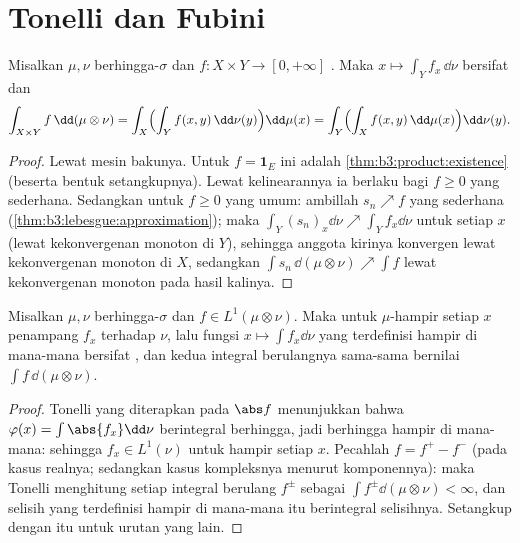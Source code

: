 \section{Tonelli dan Fubini}

\begin{theorem}[Tonelli]\label{thm:b3:product:tonelli}
Misalkan $\mu, \nu$ berhingga-$\sigma$ dan $f \colon X\times Y \to [0,
+\infty]$ . Maka $x \mapsto \int_Y f_x\,\dd\nu$ bersifat
 dan
\[
\int_{X\times Y}f\,\dd(\mu\otimes\nu)
= \int_X\Bigl(\int_Y f(x,y)\,\dd\nu(y)\Bigr)\dd\mu(x)
= \int_Y\Bigl(\int_X f(x,y)\,\dd\mu(x)\Bigr)\dd\nu(y).
\]
\end{theorem}

\begin{proof}
Lewat mesin bakunya. Untuk $f = \mathbf 1_E$ ini adalah
\cref{thm:b3:product:existence} (beserta bentuk setangkupnya). Lewat
kelinearannya ia berlaku bagi $f \geq 0$ yang sederhana. Sedangkan untuk $f \geq
0$ yang umum: ambillah $s_n \nearrow f$ yang sederhana
(\cref{thm:b3:lebesgue:approximation}); maka $\int_Y(s_n)_x
\dd\nu \nearrow \int_Y f_x\dd\nu$ untuk setiap $x$ (lewat kekonvergenan monoton di $Y$),
sehingga anggota kirinya konvergen lewat kekonvergenan monoton di $X$, sedangkan
$\int s_n\,\dd(\mu\otimes\nu) \nearrow \int f$ lewat kekonvergenan monoton pada
hasil kalinya.
\end{proof}

\begin{theorem}[Fubini]\label{thm:b3:product:fubini}
Misalkan $\mu, \nu$ berhingga-$\sigma$ dan $f \in L^1(\mu\otimes\nu)$. Maka
untuk $\mu$-hampir setiap $x$ penampang $f_x$  terhadap $\nu$, lalu
fungsi $x \mapsto \int f_x\dd\nu$ yang terdefinisi hampir di mana-mana bersifat
, dan kedua integral berulangnya sama-sama bernilai
$\int f\,\dd(\mu\otimes\nu)$.
\end{theorem}

\begin{proof}
Tonelli yang diterapkan pada $\abs f$ menunjukkan bahwa $\varphi(x) = \int\abs{f_x}
\dd\nu$ berintegral berhingga, jadi berhingga hampir di mana-mana: sehingga $f_x \in
L^1(\nu)$ untuk hampir setiap $x$. Pecahlah $f = f^+ - f^-$ (pada kasus realnya;
sedangkan kasus kompleksnya menurut komponennya): maka Tonelli menghitung setiap integral
berulang $f^\pm$ sebagai $\int f^\pm\dd(\mu\otimes\nu) <
\infty$, dan selisih yang terdefinisi hampir di mana-mana itu berintegral
selisihnya. Setangkup dengan itu untuk urutan yang lain.
\end{proof}

